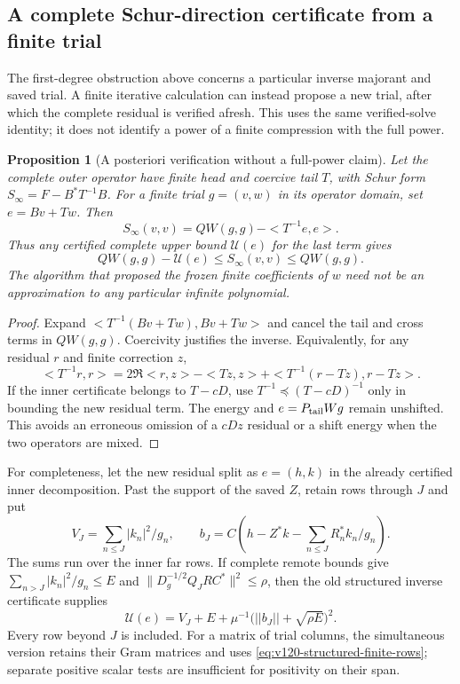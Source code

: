 \documentclass[11pt]{article}
\def\norm#1{||#1||}%
\def\ip#1#2{<#1,#2>}%
\newtheorem{proposition}[theorem]{Proposition}
\theoremstyle{remark}
\newcommand{\norm}[1]{\left\lVert #1\right\rVert}
\newcommand{\ip}[2]{\left\langle #1,#2\right\rangle}
\begin{document}
\subsection{A complete Schur-direction certificate from a finite trial}

The first-degree obstruction above concerns a particular inverse
majorant and saved trial. A finite iterative calculation can instead
propose a new trial, after which the complete residual is verified
afresh. This uses the same verified-solve identity; it does not
identify a power of a finite compression with the full power.

\begin{proposition}[A posteriori verification without a full-power claim]
\label{prop:v124-posterior-identity}
Let the complete outer operator have finite head and coercive
tail $T$, with Schur form $S_\infty=F-B^*T^{-1}B$.
For a finite trial $g=(v,w)$ in its operator domain, set
$e=Bv+Tw$. Then
\begin{equation}\label{eq:v124-posterior-identity}
 S_\infty(v,v)=QW(g,g)-\ip{T^{-1}e}{e}.
\end{equation}
Thus any certified complete upper bound $\mathcal U(e)$ for the
last term gives
\[
 QW(g,g)-\mathcal U(e)\le S_\infty(v,v)\le QW(g,g).
\]
The algorithm that proposed the frozen finite coefficients of $w$
need not be an approximation to any particular infinite polynomial.
\end{proposition}
\begin{proof}
Expand $\ip{T^{-1}(Bv+Tw)}{Bv+Tw}$ and cancel the tail and
cross terms in $QW(g,g)$. Coercivity justifies the inverse.
Equivalently, for any residual $r$ and finite correction $z$,
\[
 \ip{T^{-1}r}{r}
 =2\Re\ip rz-\ip{Tz}{z}
       +\ip{T^{-1}(r-Tz)}{r-Tz}.
\]
If the inner certificate belongs to $T-cD$, use
$T^{-1}\preceq(T-cD)^{-1}$ only in bounding the new residual
term. The energy and $e=P_{\rm tail}Wg$ remain unshifted.
This avoids an erroneous omission of a $cDz$ residual or a shift
energy when the two operators are mixed.
\end{proof}

For completeness, let the new residual split as $e=(h,k)$ in
the already certified inner decomposition. Past the support of
the saved $Z$, retain rows through $J$ and put
\[
 V_J=\sum_{n\le J}|k_n|^2/g_n,\qquad
 b_J=C\left(h-Z^*k-\sum_{n\le J}R_n^*k_n/g_n\right).
\]
The sums run over the inner far rows. If complete remote bounds
give $\sum_{n>J}|k_n|^2/g_n\le E$ and
$\|D_g^{-1/2}Q_JRC^*\|^2\le\rho$, then the old structured
inverse certificate supplies
\begin{equation}\label{eq:v124-posterior-upper}
 \mathcal U(e)=V_J+E+
       \mu^{-1}\bigl(\norm{b_J}+\sqrt{\rho E}\bigr)^2.
\end{equation}
Every row beyond $J$ is included. For a matrix of trial columns,
the simultaneous version retains their Gram matrices and uses
\eqref{eq:v120-structured-finite-rows}; separate positive scalar
tests are insufficient for positivity on their span.
\end{document}
